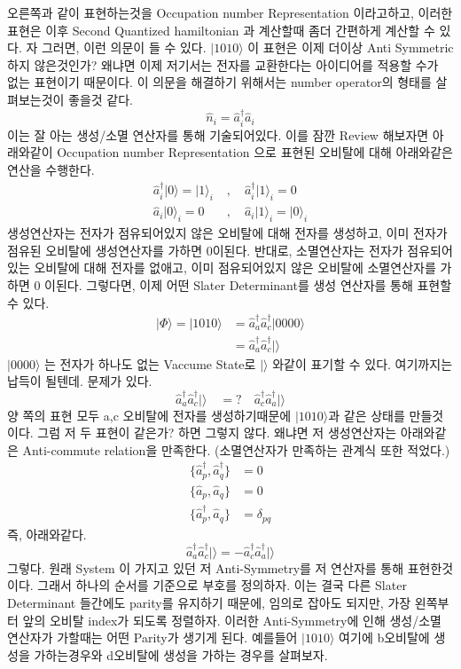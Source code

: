 \documentclass[11pt]{article}
\begin{document}
오른쪽과 같이 표현하는것을 Occupation number Representation 이라고하고, 이러한 표현은 이후 Second Quantized hamiltonian 과 계산할때 좀더 간편하게 계산할 수 있다. 
자 그러면, 이런 의문이 들 수 있다. \(\vert 1010 \rangle \) 이 표현은 이제 더이상 Anti Symmetric 하지 않은것인가? 왜냐면 이제 저기서는 전자를 교환한다는 아이디어를 적용할 수가 없는 표현이기 때문이다. 
이 의문을 해결하기 위해서는 number operator의 형태를 살펴보는것이 좋을것 같다. 
\[
\hat{n}_i = \hat{a}_i^{\dagger}\hat{a}_i
\]
이는 잘 아는 생성/소멸 연산자를 통해 기술되어있다. 이를 잠깐 Review 해보자면 아래와같이 Occupation number Representation 으로 표현된 오비탈에 대해 아래와같은 연산을 수행한다. 
\begin{align*}
\hat{a}_i^{\dagger} \vert 0 \rangle = \vert 1 \rangle_i &,\quad \hat{a}_i^{\dagger} \vert 1 \rangle_i = 0 \\
\hat{a}_i \vert 0 \rangle_i = 0 \quad &,\quad \hat{a}_i \vert 1 \rangle_i = \vert 0 \rangle_i
\end{align*}
생성연산자는 전자가 점유되어있지 않은 오비탈에 대해 전자를 생성하고, 이미 전자가 점유된 오비탈에 생성연산자를 가하면 0이된다. 
반대로, 소멸연산자는 전자가 점유되어있는 오비탈에 대해 전자를 없애고, 이미 점유되어있지 않은 오비탈에 소멸연산자를 가하면 0 이된다. 
그렇다면, 이제 어떤 Slater Determinant를 생성 연산자를 통해 표현할 수 있다. 
\begin{align*}
| \Phi \rangle = \vert 1010 \rangle &= \hat{a}_a^{\dagger}\hat{a}_c^{\dagger} \vert 0000 \rangle \\
&= \hat{a}_a^{\dagger}\hat{a}_c^{\dagger} \vert \rangle 
\end{align*}
\(\vert 0000 \rangle\) 는 전자가 하나도 없는 Vaccume State로 \(\vert \rangle\) 와같이 표기할 수 있다. 여기까지는 납득이 될텐데. 문제가 있다. 
\[
\hat{a}_a^{\dagger}\hat{a}_c^{\dagger} \vert \rangle \quad =? \quad \hat{a}_c^{\dagger}\hat{a}_a^{\dagger} \vert \rangle
\]
양 쪽의 표현 모두 a,c 오비탈에 전자를 생성하기때문에 \(\vert 1010 \rangle \)과 같은 상태를 만들것이다. 그럼 저 두 표현이 같은가? 하면 그렇지 않다. 
왜냐면 저 생성연산자는 아래와같은 Anti-commute relation을 만족한다. (소멸연산자가 만족하는 관계식 또한 적었다.)
\begin{align*}
\{ \hat{a}_p^\dagger, \hat{a}_q^\dagger \} &= 0 \\
\{ \hat{a}_p, \hat{a}_q \} &= 0 \\
\{ \hat{a}_p^\dagger, \hat{a}_q \} &= \delta_{pq}
\end{align*}
즉, 아래와같다. 
\[
\hat{a}_a^{\dagger}\hat{a}_c^{\dagger} \vert \rangle  = - \hat{a}_c^{\dagger}\hat{a}_a^{\dagger} \vert \rangle
\]
그렇다. 원래 System 이 가지고 있던 저 Anti-Symmetry를 저 연산자를 통해 표현한것이다. 그래서 하나의 순서를 기준으로 부호를 정의하자. 이는 결국 다른 Slater Determinant 들간에도 parity를 유지하기 때문에, 임의로 잡아도 되지만, 
가장 왼쪽부터 앞의 오비탈 index가 되도록 정렬하자. 이러한 Anti-Symmetry에 인해 생성/소멸 연산자가 가할때는 어떤 Parity가 생기게 된다. 
예를들어 \(\vert 1010 \rangle \) 여기에 b오비탈에 생성을 가하는경우와 d오비탈에 생성을 가하는 경우를 살펴보자. 
\end{document}
